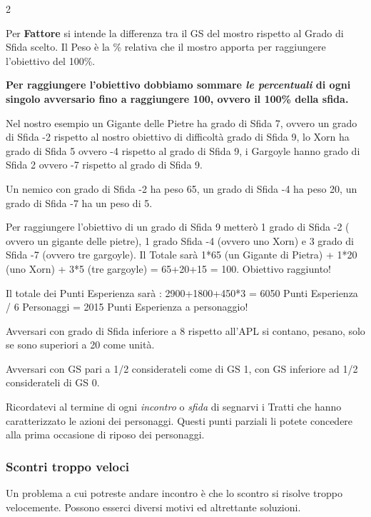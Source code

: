 \begin{multicols}{2}
\medskip

Per \textbf{Fattore} si intende la differenza tra il GS del mostro rispetto al Grado di Sfida scelto. Il Peso è la \% relativa che il mostro apporta per raggiungere l'obiettivo del 100\%.

\textbf{Per raggiungere l'obiettivo dobbiamo sommare \emph{le percentuali} di ogni singolo avversario fino a raggiungere 100, ovvero il 100\% della sfida.}

Nel nostro esempio un Gigante delle Pietre ha grado di Sfida 7, ovvero un grado di Sfida -2 rispetto al nostro obiettivo di difficoltà grado di Sfida 9, lo Xorn ha grado di Sfida 5 ovvero -4 rispetto al grado di Sfida 9, i Gargoyle hanno grado di Sfida 2 ovvero -7 rispetto al grado di Sfida 9.

Un nemico con grado di Sfida -2 ha peso 65, un grado di Sfida -4 ha peso 20, un grado di Sfida -7 ha un peso di 5.

Per raggiungere l'obiettivo di un grado di Sfida 9 metterò 1 grado di Sfida -2 ( ovvero un gigante delle pietre), 1 grado Sfida -4 (ovvero uno Xorn) e 3 grado di Sfida -7 (ovvero tre gargoyle). Il Totale sarà 1*65 (un Gigante di Pietra) + 1*20 (uno Xorn) + 3*5 (tre gargoyle) = 65+20+15 = 100. Obiettivo raggiunto!

Il totale dei Punti Esperienza sarà : 2900+1800+450*3 = 6050 Punti Esperienza / 6 Personaggi = 2015 Punti Esperienza a personaggio!

Avversari con grado di Sfida inferiore a 8 rispetto all'APL si contano, pesano, solo se sono superiori a 20 come unità.

Avversari con GS pari a 1/2 considerateli come di GS 1, con GS inferiore ad 1/2 considerateli di GS 0.

\begin{narratore}
Ricordatevi al termine di ogni \emph{incontro} o \emph{sfida} di segnarvi i Tratti che hanno caratterizzato le azioni dei personaggi. Questi punti parziali li potete concedere alla prima occasione di riposo dei personaggi.
\end{narratore}

\subsubsection{Scontri troppo veloci}

Un problema a cui potreste andare incontro è che lo scontro si risolve troppo velocemente. Possono esserci diversi motivi ed altrettante soluzioni.


\end{multicols}
